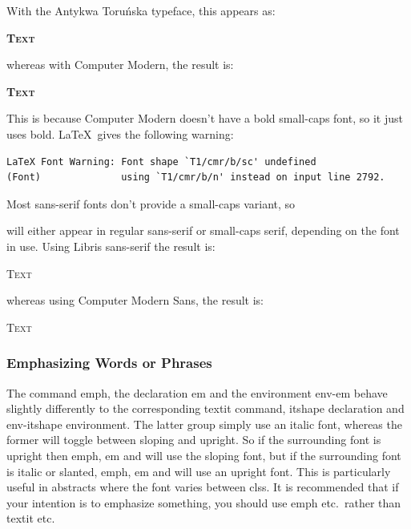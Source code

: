 \begin{codeS}
\end{codeS}
With the Antykwa Toru\'nska typeface, this appears as:
\begin{resultS}
\textsc{\bfseries Text}
\end{resultS}\bookpagebreak\noindent
whereas with Computer Modern, the result is:
\begin{resultS}\selectfont
\textsc{\bfseries Text}
\end{resultS}
This is because Computer Modern doesn't have a bold small-caps
font, so it just uses bold. \LaTeX\ gives the following warning:
\begin{verbatim}
LaTeX Font Warning: Font shape `T1/cmr/b/sc' undefined
(Font)              using `T1/cmr/b/n' instead on input line 2792.
\end{verbatim}
Most sans-serif fonts don't provide a small-caps variant, so 
\begin{codeS}
\end{codeS}
will either appear in regular sans-serif or small-caps serif,
depending on the font in use. Using Libris sans-serif the result is:
\begin{resultS}
\textsf{\scshape Text}
\end{resultS}
whereas using Computer Modern Sans, the result is:
\begin{resultS}
\scshape Text
\end{resultS}

\subsubsection{Emphasizing Words or Phrases}
\label{sec:emph}

The \gls{command} \gls{emph},
the \gls{declaration} \gls{em} and the
\gls{environment} \gls{env-em} behave slightly
differently to the corresponding \gls{textit} command,
\gls{itshape} declaration and \gls{env-itshape} environment.
The latter group simply use an italic font, whereas the former will toggle
between sloping and upright.  So if the surrounding font is upright
then \gls{emph}, \gls{em} and  will use the
sloping font, but if the surrounding font is italic or slanted,
\gls{emph}, \gls{em} and  will use an upright
font.  This is particularly useful in abstracts where the
 font varies between \glspl{cls}.  It is recommended that if your intention
is to emphasize something, you should use \gls{emph} etc.\ rather
than \gls{textit} etc.\screenpagebreak

